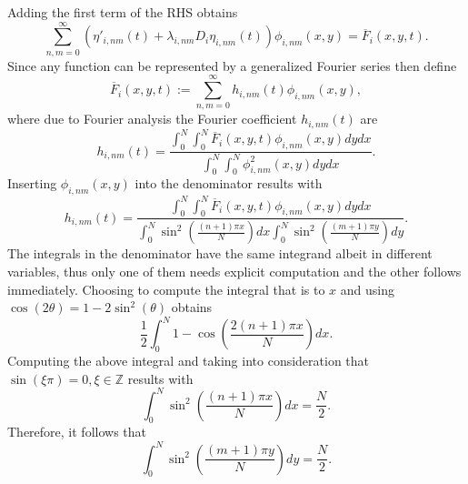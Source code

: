 \documentclass[\main/thesis.tex]{subfiles}
\begin{document}
Adding the first term of the RHS obtains
\begin{equation}
	    \sum_{n,m {=} 0}^{\infty}
	      \left( 
	        \eta'_{i,nm}(t) {+} \lambda_{i,nm} D_i \eta_{i,nm}(t)
	      \right) 
	      \phi_{i,nm}(x, y)
	{=} \overline{F}_i(x, y, t).
	\label{eq:time_source_relation}
\end{equation} 
Since any function can be represented by a generalized Fourier series then define
\begin{equation*}
	\overline{F}_{i}(x, y, t) {:=} \sum_{n,m {=} 0}^{\infty} h_{i,nm}(t) 
	                                                         \phi_{i,nm}(x, y),
\end{equation*}
where due to Fourier analysis the Fourier coefficient $h_{i,nm}(t)$ are
\begin{equation*}
	h_{i,nm}(t) {=} \frac{\int_{0}^{N} \int_{0}^{N} \overline{F}_i(x, y, t) \phi_{i,nm}(x, y) dydx}
	                     {\int_{0}^{N} \int_{0}^{N} \phi_{i,nm}^2(x, y) dydx}.
\end{equation*}
Inserting $\phi_{i,nm}(x, y)$ into the denominator results with
\begin{equation*}
	h_{i,nm}(t) {=} \frac{\int_{0}^{N} \int_{0}^{N} \overline{F}_i(x, y, t)	\phi_{i,nm}(x, y) dydx}
	                     {\int_{0}^{N} \sin^2\left( \frac{(n {+} 1) \pi x}{N} \right) dx
	                      \int_{0}^{N} \sin^2\left( \frac{(m {+} 1) \pi y}{N} \right) dy}.
\end{equation*}
The integrals in the denominator have the same integrand albeit in different 
variables, thus only one of them needs explicit computation and the other 
follows immediately. Choosing to compute the integral that is \wrt to $x$ and 
using $\cos(2 \theta) {=} 1 {-} 2 \sin^2(\theta)$ obtains 
\begin{equation*}
	\frac{1}
	     {2}
	\int_{0}^{N} 1 {-} \cos\left( 
	                         \frac{2 (n {+} 1) \pi x}
	                              {N}
	                       \right) dx.
\end{equation*} 
Computing the above integral and taking into consideration that \newline
$\sin(\xi \pi) {=} 0, \xi {\in} \mathbb{Z}$ results with
\begin{equation*}
	    \int_{0}^{N} \sin^2\left( 
	                         \frac{(n {+} 1) \pi x}
	                              {N}
	                       \right) dx
	{=} \frac{N}
	         {2}.
\end{equation*}
Therefore, it follows that
\begin{equation*}
	    \int_{0}^{N} \sin^2\left( 
	                         \frac{(m {+} 1) \pi y}
	                              {N}
	                       \right) dy
    {=} \frac{N}
             {2}.
\end{equation*}
\end{document}
